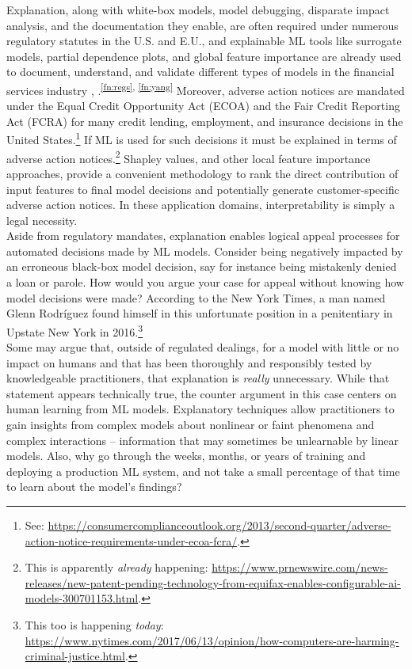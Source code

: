 \documentclass[fleqn]{article}
\begin{document}
Explanation, along with white-box models, model debugging, disparate impact analysis, and the documentation they enable, are often required under numerous regulatory statutes in the U.S. and E.U., and explainable ML tools like surrogate models, partial dependence plots, and global feature importance are already used to document, understand, and validate different types of models in the financial services industry \cite{lime-sup}, \cite{wf_xnn}.\textsuperscript{\ref{fn:regs}, \ref{fn:yang}} Moreover, adverse action notices are mandated under the Equal Credit Opportunity Act (ECOA) and the Fair Credit Reporting Act (FCRA) for many credit lending, employment, and insurance decisions in the United States.\footnote{See: \url{https://consumercomplianceoutlook.org/2013/second-quarter/adverse-action-notice-requirements-under-ecoa-fcra/}.} If ML is used for such decisions it must be explained in terms of adverse action notices.\footnote{This is apparently \textit{already} happening: \url{https://www.prnewswire.com/news-releases/new-patent-pending-technology-from-equifax-enables-configurable-ai-models-300701153.html}.} Shapley values, and other local feature importance approaches, provide a convenient methodology to rank the direct contribution of input features to final model decisions and potentially generate customer-specific adverse action notices. In these application domains, interpretability is simply a legal necessity.\\

Aside from regulatory mandates, explanation enables logical appeal processes for automated decisions made by ML models. Consider being negatively impacted by an erroneous black-box model decision, say for instance being mistakenly denied a loan or parole. How would you argue your case for appeal without knowing how model decisions were made? According to the New York Times, a man named Glenn Rodr\'iguez found himself in this unfortunate position in a penitentiary in Upstate New York in 2016.\footnote{This too is happening \textit{today}: \url{https://www.nytimes.com/2017/06/13/opinion/how-computers-are-harming-criminal-justice.html}.}\\

Some may argue that, outside of regulated dealings, for a model with little or no impact on humans and that has been thoroughly and responsibly tested by knowledgeable practitioners, that explanation is \textit{really} unnecessary. While that statement appears technically true, the counter argument in this case centers on human learning from ML models. Explanatory techniques allow practitioners to gain insights from complex models about nonlinear or faint phenomena and complex interactions -- information that may sometimes be unlearnable by linear models. Also, why go through the weeks, months, or years of training and deploying a production ML system, and not take a small percentage of that time to learn about the model's findings?\\ 
\end{document}
